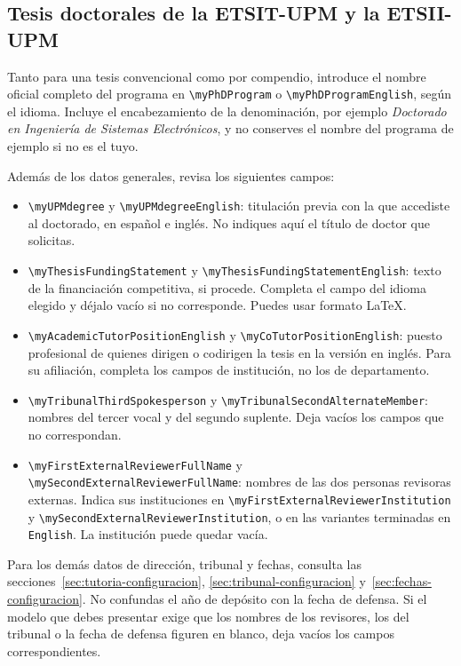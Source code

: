 \subsection{Tesis doctorales de la ETSIT-UPM y la ETSII-UPM}
\label{sec:configuracion-phd-upm}

Tanto para una tesis convencional como por compendio, introduce el nombre oficial completo del programa en \texttt{\textbackslash{}myPhDProgram} o \texttt{\textbackslash{}myPhDProgramEnglish}, según el idioma. Incluye el encabezamiento de la denominación, por ejemplo \emph{Doctorado en Ingeniería de Sistemas Electrónicos}, y no conserves el nombre del programa de ejemplo si no es el tuyo.

Además de los datos generales, revisa los siguientes campos:

\begin{itemize}
  \item \texttt{\textbackslash{}myUPMdegree} y \texttt{\textbackslash{}myUPMdegreeEnglish}: titulación previa con la que accediste al doctorado, en español e inglés. No indiques aquí el título de doctor que solicitas.
  \item \texttt{\textbackslash{}myThesisFundingStatement} y \texttt{\textbackslash{}myThesisFundingStatementEnglish}: texto de la financiación competitiva, si procede. Completa el campo del idioma elegido y déjalo vacío si no corresponde. Puedes usar formato \LaTeX{}.
  \item \texttt{\textbackslash{}myAcademicTutorPositionEnglish} y \texttt{\textbackslash{}myCoTutorPositionEnglish}: puesto profesional de quienes dirigen o codirigen la tesis en la versión en inglés. Para su afiliación, completa los campos de institución, no los de departamento.
  \item \texttt{\textbackslash{}myTribunalThirdSpokesperson} y \texttt{\textbackslash{}myTribunalSecondAlternateMember}: nombres del tercer vocal y del segundo suplente. Deja vacíos los campos que no correspondan.
  \item \texttt{\textbackslash{}myFirstExternalReviewerFullName} y \texttt{\textbackslash{}mySecondExternalReviewerFullName}: nombres de las dos personas revisoras externas. Indica sus instituciones en \texttt{\textbackslash{}myFirstExternalReviewerInstitution} y \texttt{\textbackslash{}mySecondExternalReviewerInstitution}, o en las variantes terminadas en \texttt{English}. La institución puede quedar vacía.
\end{itemize}

Para los demás datos de dirección, tribunal y fechas, consulta las secciones~\ref{sec:tutoria-configuracion}, \ref{sec:tribunal-configuracion} y~\ref{sec:fechas-configuracion}. No confundas el año de depósito con la fecha de defensa. Si el modelo que debes presentar exige que los nombres de los revisores, los del tribunal o la fecha de defensa figuren en blanco, deja vacíos los campos correspondientes.

